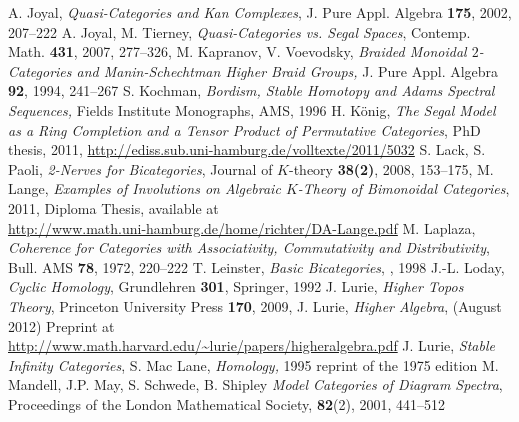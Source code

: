 \documentclass[12pt,bibliography=totoc,final]{scrbook} %
\begin{document}
\begin{thebibliography}{9999999}
 A. Joyal, \emph{Quasi-Categories and Kan Complexes}, 
J. Pure Appl. Algebra \textbf{175}, 2002, 207--222 %
 A. Joyal, M. Tierney, \emph{Quasi-Categories vs. Segal Spaces},
Contemp. Math. \textbf{431}, 2007, 277--326, 
 M. Kapranov, V. Voevodsky, \emph{Braided Monoidal $2$-Categories
and Manin-Schechtman Higher Braid Groups,} J. Pure Appl. Algebra \textbf{92}, 1994, 241--267
 S. Kochman, \emph{Bordism, Stable Homotopy and Adams Spectral Sequences,} Fields Institute Monographs, AMS, 1996
 H. K\"onig, \emph{The Segal Model as a Ring Completion and a Tensor 
Product of Permutative Categories}, PhD thesis, 2011, 
\href{http://ediss.sub.uni-hamburg.de/volltexte/2011/5032}{http://ediss.sub.uni-hamburg.de/volltexte/2011/5032}
 S. Lack, S. Paoli, \emph{2-Nerves for Bicategories},
{Journal of $K$-theory \textbf{38(2)}}, 2008, 153--175, 
 M. Lange, \emph{Examples of Involutions on Algebraic $K$-Theory of
Bimonoidal Categories}, 2011, Diploma Thesis, available at\\
\href{http://www.math.uni-hamburg.de/home/richter/DA-Lange.pdf}{http://www.math.uni-hamburg.de/home/richter/DA-Lange.pdf}
 M. Laplaza, \emph{Coherence for Categories with Associativity, 
Commutativity and Distributivity}, Bull. AMS \textbf{78}, 1972, 220--222 %
 T. Leinster, \emph{Basic Bicategories}, , 1998
 J.-L. Loday, \emph{Cyclic Homology}, Grundlehren \textbf{301}, Springer, 1992 %
 J. Lurie, \emph{Higher Topos Theory}, Princeton University Press 
\textbf{170}, 2009, 
 J. Lurie, \emph{Higher Algebra}, (August 2012) Preprint at\\ 
\href{http://www.math.harvard.edu/\textasciitilde lurie/papers/higheralgebra.pdf}{
http://www.math.harvard.edu/\textasciitilde lurie/papers/higheralgebra.pdf}
 J. Lurie, \emph{Stable Infinity Categories}, 
 S. Mac Lane, \emph{Homology,} 1995 reprint of the 1975 edition
 M. Mandell, J.P. May, S. Schwede, B. Shipley \emph{Model Categories of
Diagram Spectra}, Proceedings of the London Mathematical Society, \textbf{82}(2), 2001, 441--512 %

\end{thebibliography}
\end{document}

